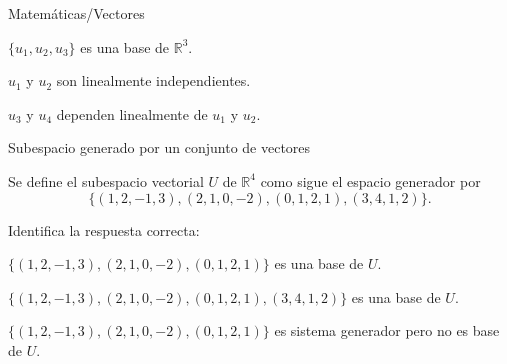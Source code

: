 \documentclass[12pt]{article}
\begin{document}
\begin{quiz}{Matemáticas/Vectores}
\begin{multi}
\item* $\{u_1, u_2, u_3\}$ es una base de $\mathbb{R}^3$.
\item $u_1$ y $u_2$ son linealmente independientes.
\item $u_3$ y $u_4$ dependen linealmente de $u_1$ y $u_2$.

\end{multi}


\begin{multi}[shuffle=true,numbering=none, feedback={
    El último vector del conjunto dado, $(3, 4, 1, 2)$, es suma de los otros tres. Se puede comprobar que los tres restantes son linealmente independientes y por tanto forman una base de $U$.
}
]{Subespacio generado por un conjunto de vectores}

Se define el subespacio vectorial $U$ de $\mathbb{R}^4$ como sigue el espacio generador por 
$$
\{(1, 2, -1, 3), (2,1, 0,-2), (0, 1, 2, 1), (3, 4, 1, 2)\}.
$$ 

Identifica la respuesta correcta:

\item* $\{(1, 2,-1, 3), (2,1, 0,-2), (0, 1, 2, 1)\}$ es una base de $U$.
\item $\{(1, 2,-1, 3), (2,1, 0,-2), (0, 1, 2, 1), (3, 4, 1, 2)\}$ es una base de $U$.
\item $\{(1, 2,-1, 3), (2,1, 0,-2), (0, 1, 2, 1)\}$ es sistema generador pero no es base de $U$.

\end{multi}

\end{quiz}
\end{document}
